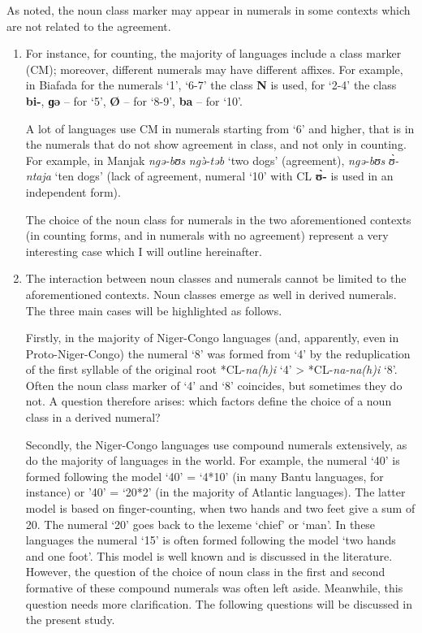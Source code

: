 As noted, the noun class marker may appear in numerals in some contexts which are not related to the agreement. 

\begin{enumerate}
\item  For instance, for counting, the majority of languages include a class marker (CM); moreover, different numerals may have different affixes. For example, in Biafada for the numerals ‘1’, ‘6-7’ the class \textbf{N} is used, for ‘2-4’ the class \textbf{bi-}, \textbf{ɡə} – for ‘5’, \textbf{Ø} – for ‘8-9’, \textbf{ba} – for ‘10’. 

A lot of languages use CM in numerals starting from ‘6’ and higher, that is in the numerals that do not show agreement in class, and not only in counting. For example, in Manjak \textit{ngə-bʊs} \textit{ng{\`{ə}}-təb} ‘two dogs’ (agreement), \textit{ngə-bʊs} \textit{{\`{ʊ}}-ntaja} ‘ten dogs’ (lack of agreement, numeral ‘10’ with CL \textbf{{\`{ʊ}}-} is used in an independent form). 

The choice of the noun class for numerals in the two aforementioned contexts (in counting forms, and in numerals with no agreement) represent a very interesting case which I will outline hereinafter. 

\item The interaction between noun classes and numerals cannot be limited to the aforementioned contexts. Noun classes emerge as well in derived numerals. The three main cases will be highlighted as follows. 

Firstly, in the majority of Niger-Congo languages (and, apparently, even in Proto-Niger-Congo) the numeral `8' was formed from `4' by the reduplication of the first syllable of the original root *CL-\textit{na(h)i} ‘4’ > *CL-\textit{na-na(h)i} ‘8’. Often the noun class marker of `4' and `8' coincides, but sometimes they do not. A question therefore arises: which factors define the choice of a noun class in a derived numeral? 

Secondly, the Niger-Congo languages use compound numerals extensively, as do the majority of languages in the world. For example, the numeral ‘40’ is formed following the model ‘40’ = ‘4*10’ (in many Bantu languages, for instance) or ’40’ = ‘20*2’ (in the majority of Atlantic languages). The latter model is based on finger-counting, when two hands and two feet give a sum of 20. The numeral ‘20’ goes back to the lexeme ‘chief’ or ‘man’. In these languages the numeral ‘15’ is often formed following the model ‘two hands and one foot’. This model is well known and is discussed in the literature. However, the question of the choice of noun class in the first and second formative of these compound numerals was often left aside. Meanwhile, this question needs more clarification. The following questions will be discussed in the present study. 


\end{enumerate}

